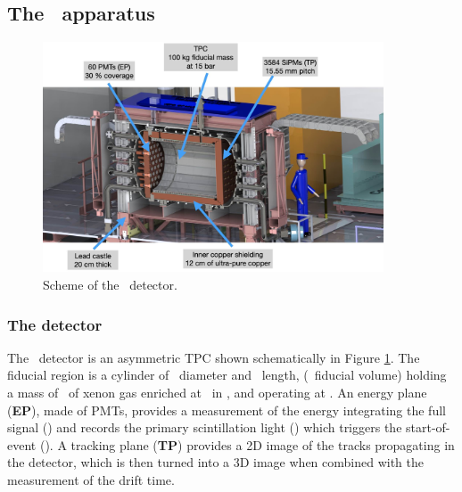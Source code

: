 \subsection{The \Next\ apparatus}
\label{sec.next100}

\begin{figure}[htbp!]
\centering
\includegraphics[width=0.9\textwidth]{img2/NEXT-100-description.jpg}
\caption{\small Scheme of the \NEXT\ detector.}
\label{fig.next-100}
\end{figure}

\subsubsection{The detector}

The \Next\ detector is an asymmetric \HPXeEL TPC shown schematically in Figure \ref{fig.next-100}.  The fiducial region is a cylinder of \NextTpcDiameter\ diameter and \NextTpcLength\ length, (\NextFiducialVolume\ fiducial volume) holding a mass of \NextFiducialMass\ of xenon gas enriched at \XeEnrichment\ in \XE, and operating at \NextPressure.  An energy plane ({\bf EP}),
made of PMTs, provides a measurement of the energy integrating the full signal (\stwo) and records the primary scintillation light (\sone) which triggers the start-of-event (\tz). A tracking plane ({\bf TP}) provides a 2D image of the tracks propagating in the detector, which is then turned into a 3D image when combined with the measurement of the drift time.  

\indent

